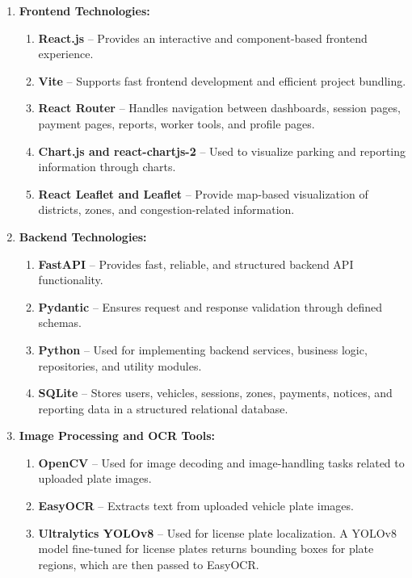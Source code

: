 \documentclass[12pt,a4paper,oneside]{report}
\begin{document}
\begin{enumerate}[leftmargin=2em,label=\arabic*.]
    \item \textbf{Frontend Technologies:}
    \begin{enumerate}[leftmargin=2.5em,label=\arabic*.]
        \item \textbf{React.js} – Provides an interactive and component-based frontend experience.
        \item \textbf{Vite} – Supports fast frontend development and efficient project bundling.
        \item \textbf{React Router} – Handles navigation between dashboards, session pages, payment pages, reports, worker tools, and profile pages.
        \item \textbf{Chart.js and react-chartjs-2} – Used to visualize parking and reporting information through charts.
        \item \textbf{React Leaflet and Leaflet} – Provide map-based visualization of districts, zones, and congestion-related information.
    \end{enumerate}

    \item \textbf{Backend Technologies:}
    \begin{enumerate}[leftmargin=2.5em,label=\arabic*.]
        \item \textbf{FastAPI} – Provides fast, reliable, and structured backend API functionality.
        \item \textbf{Pydantic} – Ensures request and response validation through defined schemas.
        \item \textbf{Python} – Used for implementing backend services, business logic, repositories, and utility modules.
        \item \textbf{SQLite} – Stores users, vehicles, sessions, zones, payments, notices, and reporting data in a structured relational database.
    \end{enumerate}

    \item \textbf{Image Processing and OCR Tools:}
    \begin{enumerate}[leftmargin=2.5em,label=\arabic*.]
        \item \textbf{OpenCV} – Used for image decoding and image-handling tasks related to uploaded plate images.
        \item \textbf{EasyOCR} – Extracts text from uploaded vehicle plate images.
        \item \textbf{Ultralytics YOLOv8} – Used for license plate localization. A YOLOv8 model fine-tuned for license plates returns bounding boxes for plate regions, which are then passed to EasyOCR.
    \end{enumerate}


\end{enumerate}
\end{document}
